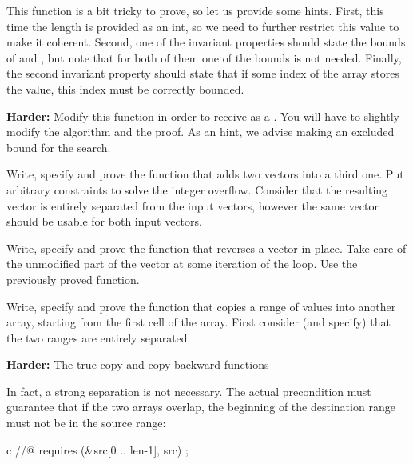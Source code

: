 

This function is a bit tricky to prove, so let us provide some hints. First,
this time the length is provided as an int, so we need to further restrict
this value to make it coherent. Second, one of the invariant properties
should state the bounds of  and , but note
that for both of them one of the bounds is not needed. Finally, the second
invariant property should state that if some index of the array stores the
value, this index must be correctly bounded.


\textbf{Harder:} Modify this function in order to receive 
as a . You will have to slightly modify the algorithm
and the proof. As an hint, we advise making  an excluded
bound for the search.




Write, specify and prove the function that adds two vectors into a third
one. Put arbitrary constraints to solve the integer overflow. Consider that
the resulting vector is entirely separated from the input vectors, however
the same vector should be usable for both input vectors.






Write, specify and prove the function that reverses a vector in place. Take
care of the unmodified part of the vector at some iteration of the loop.
Use the previously proved  function.






Write, specify and prove the function  that copies a range
of values into another array, starting from the first cell of the array.
First consider (and specify) that the two ranges are entirely separated.




\textbf{Harder:} The true copy and copy backward functions

In fact, a strong separation is not necessary. The actual precondition must
guarantee that if the two arrays overlap, the beginning of the destination
range must not be in the source range:

\begin{CodeBlock}{c}
//@ requires \separated(&src[0 .. len-1], src) ;
\end{CodeBlock}


